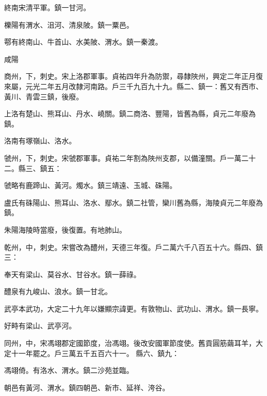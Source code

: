 \begin{pinyinscope}
 終南宋清平軍。鎮一甘河。



 櫟陽有渭水、沮河、清泉陂。鎮一粟邑。



 鄠有終南山、牛首山、水美陂、渭水。鎮一秦渡。



 咸陽



 商州，下，刺史。宋上洛郡軍事。貞祐四年升為防禦，尋隸陜州，興定二年正月復來屬，元光二年五月改隸河南路。戶三千九百九十九。縣二、鎮一：舊又有西市、黃川、青雲三鎮，後廢。



 上洛有楚山、熊耳山、丹水、嶢關。鎮二商洛、豐陽，皆舊為縣，貞元二年廢為鎮。



 洛南有塚嶺山、洛水。



 虢州，下，刺史。宋虢郡軍事。貞祐二年割為陜州支郡，以備潼關。戶一萬二十二。縣三、鎮五：



 虢略有鹿蹄山、黃河。燭水。鎮三靖遠、玉城、硃陽。



 盧氏有硃陽山、熊耳山、洛水、鄢水。鎮二社管，欒川舊為縣，海陵貞元二年廢為鎮。



 朱陽海陵時當廢，後復置。有地肺山。



 乾州，中，刺史。宋嘗改為醴州，天德三年復。戶二萬六千八百五十六。縣四、鎮三：



 奉天有梁山、莫谷水、甘谷水。鎮一薛祿。



 醴泉有九峻山、浪水。鎮一甘北。



 武亭本武功，大定二十九年以嫌顯宗諱更。有敦物山、武功山、渭水。鎮一長寧。



 好畤有梁山、武亭河。



 同州，中，宋馮翊郡定國節度，治馮翊。後改安國軍節度使。舊貢圓筋繭耳羊，大定十一年罷之。戶三萬五千五百六十一。
 縣六、鎮九：



 馮翊倚。有洛水、渭水。鎮二沙苑並臨。



 朝邑有黃河、渭水。鎮四朝邑、新市、延祥、洿谷。




\end{pinyinscope}
